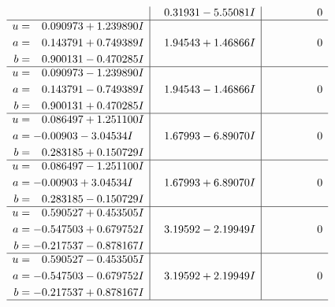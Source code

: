 \documentclass[1p]{elsarticle_modified}
\theoremstyle{definition}
\begin{document}
$$\begin{array}{c|c|c}
 & \phantom{-}0.31931 - 5.55081 I & \phantom{-0.000000 } 0 \\ \hline\begin{aligned}
u &= \phantom{-}0.090973 + 1.239890 I \\
a &= \phantom{-}0.143791 + 0.749389 I \\
b &= \phantom{-}0.900131 - 0.470285 I\end{aligned}
 & \phantom{-}1.94543 + 1.46866 I & \phantom{-0.000000 } 0 \\ \hline\begin{aligned}
u &= \phantom{-}0.090973 - 1.239890 I \\
a &= \phantom{-}0.143791 - 0.749389 I \\
b &= \phantom{-}0.900131 + 0.470285 I\end{aligned}
 & \phantom{-}1.94543 - 1.46866 I & \phantom{-0.000000 } 0 \\ \hline\begin{aligned}
u &= \phantom{-}0.086497 + 1.251100 I \\
a &= -0.00903 - 3.04534 I \\
b &= \phantom{-}0.283185 + 0.150729 I\end{aligned}
 & \phantom{-}1.67993 - 6.89070 I & \phantom{-0.000000 } 0 \\ \hline\begin{aligned}
u &= \phantom{-}0.086497 - 1.251100 I \\
a &= -0.00903 + 3.04534 I \\
b &= \phantom{-}0.283185 - 0.150729 I\end{aligned}
 & \phantom{-}1.67993 + 6.89070 I & \phantom{-0.000000 } 0 \\ \hline\begin{aligned}
u &= \phantom{-}0.590527 + 0.453505 I \\
a &= -0.547503 + 0.679752 I \\
b &= -0.217537 - 0.878167 I\end{aligned}
 & \phantom{-}3.19592 - 2.19949 I & \phantom{-0.000000 } 0 \\ \hline\begin{aligned}
u &= \phantom{-}0.590527 - 0.453505 I \\
a &= -0.547503 - 0.679752 I \\
b &= -0.217537 + 0.878167 I\end{aligned}
 & \phantom{-}3.19592 + 2.19949 I & \phantom{-0.000000 } 0\\
 \hline 
 \end{array}$$\newpage$$\begin{array}{c|c|c}  

\end{array}$$
\end{document}
